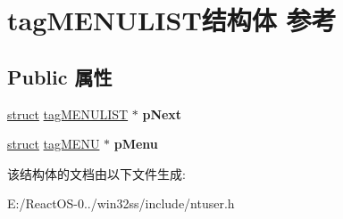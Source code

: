 \hypertarget{structtag_m_e_n_u_l_i_s_t}{}\section{tag\+M\+E\+N\+U\+L\+I\+S\+T结构体 参考}
\label{structtag_m_e_n_u_l_i_s_t}
\subsection*{Public 属性}
\begin{DoxyCompactItemize}
\item 
\mbox{\label{structtag_m_e_n_u_l_i_s_t_ade7edfc22d95e177cc46f7daafd0d54e}} 
\hyperlink{interfacestruct}{struct} \hyperlink{structtag_m_e_n_u_l_i_s_t}{tag\+M\+E\+N\+U\+L\+I\+ST} $\ast$ {\bfseries p\+Next}
\item 
\mbox{\label{structtag_m_e_n_u_l_i_s_t_a2eb3571cc145ce188d2f05892b748992}} 
\hyperlink{interfacestruct}{struct} \hyperlink{structtag_m_e_n_u}{tag\+M\+E\+NU} $\ast$ {\bfseries p\+Menu}
\end{DoxyCompactItemize}


该结构体的文档由以下文件生成\+:\begin{DoxyCompactItemize}
\item 
E\+:/\+React\+O\+S-\/0../win32ss/include/ntuser.\+h\end{DoxyCompactItemize}
